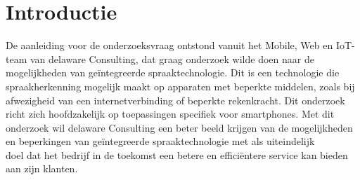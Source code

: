 
\section{Introductie}%
\label{sec:introductie}






De aanleiding voor de onderzoeksvraag ontstond vanuit het Mobile, Web en IoT-team van delaware Consulting, dat graag onderzoek wilde doen naar de mogelijkheden van geïntegreerde spraaktechnologie. Dit is een technologie die spraakherkenning mogelijk maakt op apparaten met beperkte middelen, zoals bij afwezigheid van een internetverbinding of beperkte rekenkracht. Dit onderzoek richt zich hoofdzakelijk op toepassingen specifiek voor smartphones. Met dit onderzoek wil delaware Consulting een beter beeld krijgen van de mogelijkheden en beperkingen van geïntegreerde spraaktechnologie met als uiteindelijk \\doel dat het bedrijf in de toekomst een betere en efficiëntere service kan bieden aan zijn klanten.

